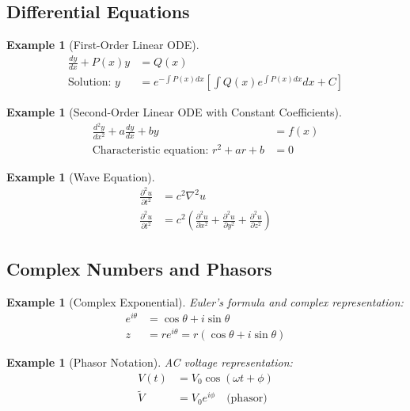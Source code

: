 \documentclass{article}
\newtheorem{example}[theorem]{Example}
\begin{document}
\subsection{Differential Equations}

\begin{example}[First-Order Linear ODE]
\begin{align*}
    \frac{dy}{dx} + P(x)y &= Q(x) \\
    \text{Solution: } y &= e^{-\int P(x)dx}\left[\int Q(x)e^{\int P(x)dx}dx + C\right]
\end{align*}
\end{example}

\begin{example}[Second-Order Linear ODE with Constant Coefficients]
\begin{align*}
    \frac{d^2y}{dx^2} + a\frac{dy}{dx} + by &= f(x) \\
    \text{Characteristic equation: } r^2 + ar + b &= 0
\end{align*}
\end{example}

\begin{example}[Wave Equation]
\begin{align*}
    \frac{\partial^2 u}{\partial t^2} &= c^2\nabla^2 u \\
    \frac{\partial^2 u}{\partial t^2} &= c^2\left(\frac{\partial^2 u}{\partial x^2} + \frac{\partial^2 u}{\partial y^2} + \frac{\partial^2 u}{\partial z^2}\right)
\end{align*}
\end{example}

\subsection{Complex Numbers and Phasors}

\begin{example}[Complex Exponential]
Euler's formula and complex representation:
\begin{align*}
    e^{i\theta} &= \cos\theta + i\sin\theta \\
    z &= re^{i\theta} = r(\cos\theta + i\sin\theta)
\end{align*}
\end{example}

\begin{example}[Phasor Notation]
AC voltage representation:
\begin{align*}
    V(t) &= V_0\cos(\omega t + \phi) \\
    \tilde{V} &= V_0e^{i\phi} \quad \text{(phasor)}
\end{align*}
\end{example}
\end{document}
